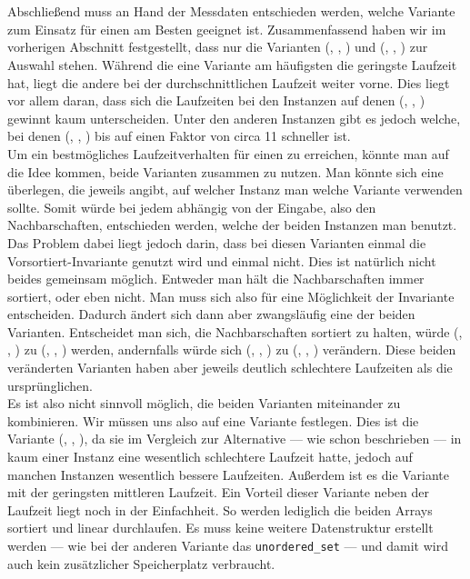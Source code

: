 
\section{}
\label{sec:entscheidung}
Abschließend muss an Hand der Messdaten entschieden werden, welche Variante zum Einsatz für
einen \ct{} am Besten geeignet ist.
Zusammenfassend haben wir im vorherigen Abschnitt festgestellt, 
dass nur die Varianten (\SorSor, \true, \distr) und (\SeaUSet, \false, \perm) zur Auswahl stehen.
Während die eine Variante am häufigsten die geringste Laufzeit hat, liegt die andere 
bei der durchschnittlichen Laufzeit weiter vorne. Dies liegt vor allem daran, dass sich 
die Laufzeiten bei den Instanzen auf denen (\SeaUSet, \false, \perm) \glqq gewinnt\grqq{} kaum unterscheiden.
Unter den anderen Instanzen gibt es jedoch welche, bei denen (\SorSor, \true, \distr) bis auf einen
Faktor von circa 11 schneller ist.
\\
Um ein bestmögliches Laufzeitverhalten für einen \ct{} zu erreichen, könnte man auf die Idee kommen, 
beide Varianten zusammen zu nutzen. Man könnte sich eine  überlegen, die jeweils angibt, 
auf welcher Instanz man welche Variante verwenden sollte. Somit würde bei jedem \ct{} abhängig von 
der Eingabe, also den Nachbarschaften, entschieden werden, welche der beiden Instanzen man benutzt. 
Das Problem dabei liegt jedoch darin, dass bei diesen Varianten einmal die Vorsortiert-Invariante
genutzt wird und einmal nicht. Dies ist natürlich nicht beides gemeinsam möglich. Entweder man hält die
Nachbarschaften immer sortiert, oder eben nicht. Man muss sich also für eine Möglichkeit der
Invariante entscheiden. Dadurch ändert sich dann aber zwangsläufig  eine der beiden Varianten. 
Entscheidet man sich, die Nachbarschaften sortiert zu halten, würde (\SeaUSet, \false, \perm) zu (\SeaUSet, \true, \perm){}
werden, andernfalls würde sich (\SorSor, \true, \distr) zu (\SorSor, \false, \distr) verändern.
Diese beiden \glqq veränderten \grqq{} Varianten haben aber jeweils deutlich schlechtere Laufzeiten
als die ursprünglichen.
\\
Es ist also nicht sinnvoll möglich, die beiden Varianten miteinander zu kombinieren. Wir müssen uns
also auf eine Variante festlegen. Dies ist die Variante (\SorSor, \true, \distr), da sie im Vergleich zur
Alternative --- wie schon beschrieben ---
in kaum einer Instanz eine wesentlich schlechtere Laufzeit hatte, jedoch auf manchen Instanzen wesentlich
bessere Laufzeiten. Außerdem ist es die Variante mit der geringsten mittleren Laufzeit. 
Ein Vorteil dieser Variante neben der Laufzeit liegt noch in der Einfachheit. So werden
lediglich die beiden Arrays sortiert und linear durchlaufen. Es muss keine weitere Datenstruktur
erstellt werden --- wie bei der anderen Variante das \texttt{unordered\_set} --- und damit wird
auch kein zusätzlicher Speicherplatz verbraucht.


